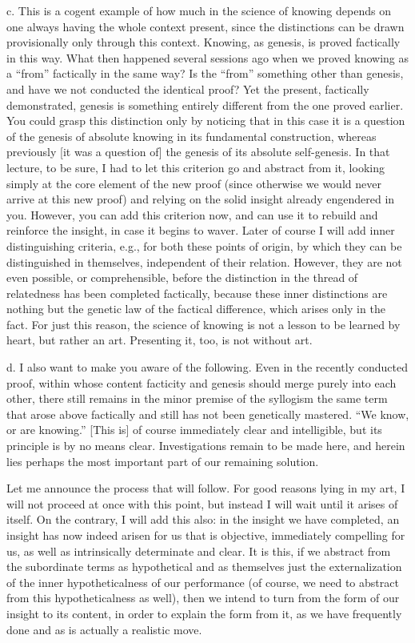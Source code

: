 c. This is a cogent example of how much
in the science of knowing depends on one
always having the whole context present,
since the distinctions can be drawn
provisionally only through this context.
Knowing, as genesis, is proved factically in this way.
What then happened several sessions ago when
we proved knowing as a “from” factically in the same way?
Is the “from” something other than genesis,
and have we not conducted the identical proof?
Yet the present, factically demonstrated, genesis is
something entirely different from the one proved earlier.
You could grasp this distinction only by
noticing that in this case it is a question of
the genesis of absolute knowing in its fundamental construction,
whereas previously [it was a question of] the
genesis of its absolute self-genesis.
In that lecture, to be sure, I had to let this
criterion go and abstract from it,
looking simply at the core element of the new proof
(since otherwise we would never arrive at this new proof)
and relying on the solid insight already engendered in you.
However, you can add this criterion now,
and can use it to rebuild and reinforce the insight,
in case it begins to waver.
Later of course I will add inner distinguishing criteria,
e.g., for both these points of origin,
by which they can be distinguished in themselves,
independent of their relation.
However, they are not even possible, or comprehensible,
before the distinction in the thread of relatedness
has been completed factically,
because these inner distinctions are nothing but
the genetic law of the factical difference,
which arises only in the fact.
For just this reason, the science of knowing is
not a lesson to be learned by heart,
but rather an art.
Presenting it, too, is not without art.

d. I also want to make you aware of the following.
Even in the recently conducted proof,
within whose content facticity and genesis should merge
purely into each other,
there still remains in the minor premise of the syllogism
the same term that arose above factically
and still has not been genetically mastered.
“We know, or are knowing.”
[This is] of course immediately clear and intelligible,
but its principle is by no means clear.
Investigations remain to be made here,
and herein lies perhaps the most important
part of our remaining solution.

Let me announce the process that will follow.
For good reasons lying in my art,
I will not proceed at once with this point,
but instead I will wait until it arises of itself.
On the contrary, I will add this also:
in the insight we have completed,
an insight has now indeed arisen for us
that is objective, immediately compelling for us,
as well as intrinsically determinate and clear.
It is this, if we abstract from the subordinate terms
as hypothetical and as themselves just the externalization of
the inner hypotheticalness of our performance
(of course, we need to abstract from this hypotheticalness as well),
then we intend to turn from the form of our insight
to its content, in order to explain the form from it,
as we have frequently done and as is actually a realistic move.

